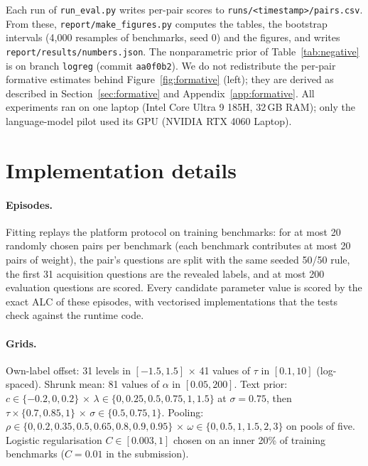 \documentclass{article}
\newcommand{\code}[1]{\texttt{#1}}
\begin{document}
{\raggedright Each run of \code{run\_eval.py} writes per-pair scores to \code{runs/<timestamp>/pairs.csv}. From these, \code{report/make\_figures.py} computes the tables, the bootstrap intervals (4{,}000 resamples of benchmarks, seed 0) and the figures, and writes \code{report/results/numbers.json}. The nonparametric prior of Table~\ref{tab:negative} is on branch \code{logreg} (commit \code{aa0f0b2}). We do not redistribute the per-pair formative estimates behind Figure~\ref{fig:formative} (left); they are derived as described in Section~\ref{sec:formative} and Appendix~\ref{app:formative}. All experiments ran on one laptop (Intel Core Ultra 9 185H, 32\,GB RAM); only the language-model pilot used its GPU (NVIDIA RTX 4060 Laptop).\par}

\section{Implementation details}
\label{app:details}

\paragraph{Episodes.} Fitting replays the platform protocol on training benchmarks: for at most 20 randomly chosen pairs per benchmark (each benchmark contributes at most 20 pairs of weight), the pair's questions are split with the same seeded 50/50 rule, the first 31 acquisition questions are the revealed labels, and at most 200 evaluation questions are scored. Every candidate parameter value is scored by the exact ALC of these episodes, with vectorised implementations that the tests check against the runtime code.

\paragraph{Grids.} Own-label offset: 31 levels in $[-1.5, 1.5]$ $\times$ 41 values of $\tau$ in $[0.1, 10]$ (log-spaced). Shrunk mean: 81 values of $\alpha$ in $[0.05, 200]$. Text prior: $c \in \{-0.2, 0, 0.2\}$ $\times$ $\lambda \in \{0, 0.25, 0.5, 0.75, 1, 1.5\}$ at $\sigma = 0.75$, then $\tau \times \{0.7, 0.85, 1\}$ $\times$ $\sigma \in \{0.5, 0.75, 1\}$. Pooling: $\rho \in \{0, 0.2, 0.35, 0.5, 0.65, 0.8, 0.9, 0.95\}$ $\times$ $\omega \in \{0, 0.5, 1, 1.5, 2, 3\}$ on pools of five. Logistic regularisation $C \in [0.003, 1]$ chosen on an inner 20\% of training benchmarks ($C = 0.01$ in the submission).
\end{document}
